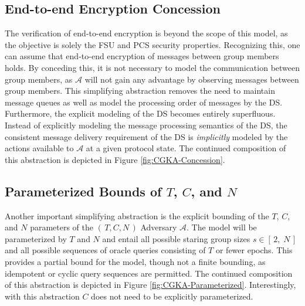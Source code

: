 \documentclass[authordraft,sigconf]{acmart}
\newcommand{\Abrev}[1]{\gls{#1}}
\newcommand{\Adversary}{\ensuremath{\mathcal{A}}\xspace}
\newcommand{\NumericRange}[2]{\ensuremath{\left[\,#1,\; #2\,\right]}\xspace}
\begin{document}
\subsection{End-to-end Encryption Concession}

The verification of end-to-end encryption is beyond the scope of this model, as the objective is solely the \Abrev{FSU} and \Abrev{PCS} security properties.
Recognizing this, one can assume that end-to-end encryption of messages between group members holds.
By conceding this, it is not necessary to model the communication between group members, as \Adversary will not gain any advantage by observing messages between group members.
This simplifying abstraction removes the need to maintain message queues as well as model the processing order of messages by the \Abrev{DS}.
Furthermore, the explicit modeling of the \Abrev{DS} becomes entirely superfluous.
Instead of explicitly modeling the message processing semantics of the \Abrev{DS}, the consistent message delivery requirement  of the \Abrev{DS} is \emph{implicitly} modeled by the actions available to \Adversary at a given protocol state.
The continued composition of this abstraction is depicted in Figure \ref{fig:CGKA-Concession}.

\begin{figure*}[ht!]
\centering
{}
\caption[Transition graph of informal CGKA definition]{%
\label{fig:CGKA-Concession}%
Gameplay after composing ``End-to-end Encryption Concession'' abstraction.%
}%
\vfill
{}
\caption[Transition graph of informal CGKA definition]{%
\label{fig:CGKA-Parameterized}%
Gameplay after composing ``Parameterized Bounds'' abstraction.%
}%
\end{figure*}

\subsection{Parameterized Bounds of $T$, $C$, and $N$}

Another important simplifying abstraction is the explicit bounding of the $T$, $C$, and $N$ parameters of the \((\,T, C, N\,)\) Adversary \Adversary.
The model will be parameterized by $T$ and $N$ and entail all possible staring group sizes $s \in \NumericRange{2}{N}$ and all possible sequences of oracle queries consisting of $T$ or fewer epochs.
This provides a partial bound for the model, though not a finite bounding, as idempotent or cyclic query sequences are permitted.
The continued composition of this abstraction is depicted in Figure \ref{fig:CGKA-Parameterized}.
Interestingly, with this abstraction $C$ does not need to be explicitly parameterized.
\end{document}
